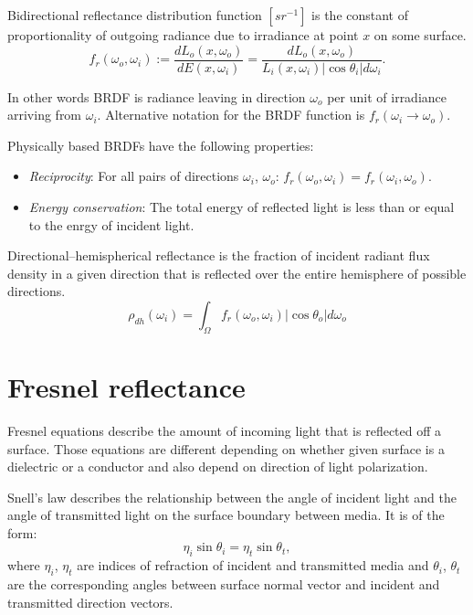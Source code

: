 \begin{df}[BRDF]
Bidirectional reflectance distribution function $[sr^{-1}]$ is the constant of proportionality of outgoing radiance due to irradiance at point $x$ on some surface.
\begin{equation}
  f_{r}(\omega_{o}, \omega_{i}) := \frac{dL_{o}(x, \omega_{o})}{dE(x, \omega_{i})} = \frac{dL_{o}(x, \omega_{o})}{L_{i}(x, \omega_{i}) |\cos\theta_{i}| d\omega_{i}}.
\end{equation}
\end{df}

In other words BRDF is radiance leaving in direction $\omega_{o}$ per unit of irradiance arriving from $\omega_{i}$. Alternative notation for the BRDF function is $f_{r}(\omega_{i} \rightarrow \omega_{o})$.

Physically based BRDFs have the following properties:
\begin{itemize}
\item \emph{Reciprocity}: For all pairs of directions $\omega_{i}$, $\omega_{o}$: $f_{r}(\omega_{o}, \omega_{i}) = f_{r}(\omega_{i}, \omega_{o})$.
\item \emph{Energy conservation}: The total energy of reflected light is less than or equal to the enrgy of incident light.
\end{itemize}

\begin{df}
Directional--hemispherical reflectance \parencite{sillion94} is the fraction of incident radiant flux density in a given direction that is reflected over the entire hemisphere of possible directions.
\begin{equation}
\label{eq:dhrefl}
  \rho_{dh}(\omega_{i}) = \int_{\Omega} f_{r}(\omega_{o}, \omega_{i}) |\cos\theta_{o}| d\omega_{o}
\end{equation}
\end{df}

\section{Fresnel reflectance}
Fresnel equations describe the amount of incoming light that is reflected off a surface. Those equations are different depending on whether given surface is a dielectric or a conductor and also depend on direction of light polarization.

\begin{df}
Snell's law describes the relationship between the angle of incident light and the angle of transmitted light on the surface boundary between media. It is of the form:
\begin{equation}
  \eta_{i} \sin\theta_{i} = \eta_{t} \sin\theta_{t},
\end{equation}
where $\eta_{i}$, $\eta_{t}$ are indices of refraction of incident and transmitted media and $\theta_{i}$, $\theta_{t}$ are the corresponding angles between surface normal vector and incident and transmitted direction vectors.
\end{df}

